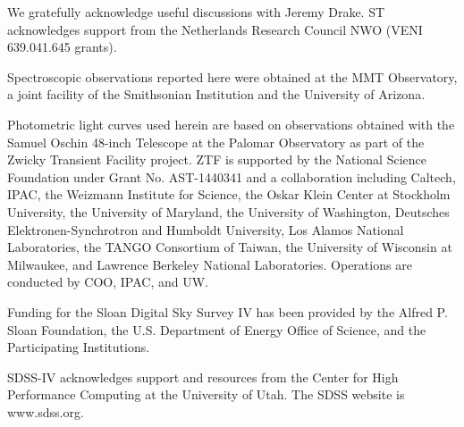 \documentclass[twocolumn]{aastex631}
\begin{document}
\begin{acknowledgments} We gratefully acknowledge useful discussions with Jeremy Drake.
ST acknowledges support from the Netherlands Research Council NWO (VENI 639.041.645 grants).

Spectroscopic observations reported here were obtained at the MMT Observatory, a joint facility of the Smithsonian Institution and the University of Arizona.

Photometric light curves used herein are based on observations obtained with the Samuel Oschin 48-inch Telescope at the Palomar Observatory as part of the Zwicky Transient Facility project. ZTF is supported by the National Science Foundation under Grant No. AST-1440341 and a collaboration including Caltech, IPAC, the Weizmann Institute for Science, the Oskar Klein Center at Stockholm University, the University of Maryland, the University of Washington, Deutsches Elektronen-Synchrotron and Humboldt University, Los Alamos National Laboratories, the TANGO Consortium of Taiwan, the University of Wisconsin at Milwaukee, and Lawrence Berkeley National Laboratories. Operations are conducted by COO, IPAC, and UW. 

Funding for the Sloan Digital Sky Survey IV has been provided by the Alfred P. Sloan Foundation, the U.S. Department of Energy Office of Science, and the Participating Institutions. 

SDSS-IV acknowledges support and resources from the Center for High Performance Computing  at the University of Utah. The SDSS website is www.sdss.org.


\end{acknowledgments}
\end{document}
